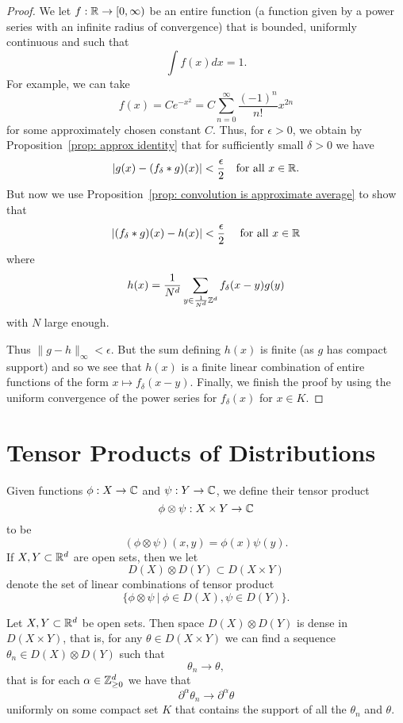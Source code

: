 \documentclass[twoside, a4paper, 10pt]{amsart}
\begin{document}
\begin{proof} We let $f:\mathbb{R} \to [0,\infty)$ be an entire function (a function given by a power series with an infinite radius of convergence) that is bounded, uniformly continuous and such that $$\int f(x) dx = 1.$$ For example, we can take $$f(x) = C e^{-x^2} = C \sum_{n=0}^{\infty} \frac{(-1)^n}{n!} x^{2n}$$ for some approximately chosen constant $C$. Thus, for $\epsilon>0$, we obtain by Proposition~\ref{prop: approx identity} that for sufficiently small $\delta>0$ we have $$|g(x) - (f_{\delta}*g)(x)| < \frac{\epsilon}{2} \quad \text{for all } x \in \mathbb{R}.$$ But now we use Proposition~\ref{prop: convolution is approximate average}  to show that $$|(f_{\delta}*g) (x) - h(x)| < \frac{\epsilon}{2} \quad \text{ for all } x \in \mathbb{R}$$ where $$h(x) = \frac{1}{N^d} \sum_{y \in \frac{1}{N^d}\mathbb{Z}^d} f_{\delta}(x-y) g(y)$$ with $N$ large enough.

 Thus $\|g - h \|_{\infty} < \epsilon$. But the sum defining $h(x)$ is finite (as $g$ has compact support) and so we see that $h(x)$ is a finite linear combination of entire functions of the form $x \mapsto f_{\delta}(x-y)$. Finally, we finish the proof by using the uniform convergence of the power series for $f_{\delta}(x)$ for $x \in K$. \end{proof}

\section{Tensor Products of Distributions}

Given functions $\phi:X \to \mathbb{C}$ and $\psi:Y \to \mathbb{C}$, we define their tensor product $$\phi \otimes \psi:X \times Y \to \mathbb{C}$$ to be $$(\phi \otimes \psi)(x,y) = \phi(x) \psi(y).$$ If $X,Y \subset \mathbb{R}^d$ are open sets, then we let $$D(X) \otimes D(Y) \subset D(X \times Y)$$ denote the set of linear combinations of tensor product $$\{\phi \otimes \psi ~|~ \phi \in D(X), \psi \in D(Y) \}.$$

\begin{prop} Let $X,Y \subset \mathbb{R}^d$ be open sets. Then space $D(X) \otimes D(Y)$ is dense in $D(X \times Y)$, that is, for any $\theta \in D(X \times Y)$ we can find a sequence $\theta_n \in D(X) \otimes D(Y)$ such that $$\theta_n \to \theta,$$ that is for each $\alpha \in \mathbb{Z}^d_{\geq 0 }$ we have that $$\partial^{\alpha} \theta_n \to \partial^{\alpha} \theta$$ uniformly on some compact set $K$ that contains the support of all the $\theta_n$ and $\theta$.

\end{prop}
\end{document}
